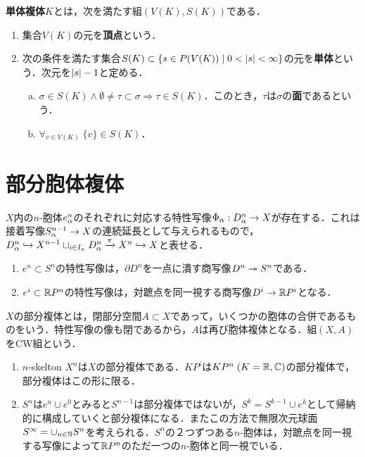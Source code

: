 \documentclass[uplatex,dvipdfmx]{jsreport}
\begin{document}
\begin{definition}
    \textbf{単体複体}$K$とは，次を満たす組$(V(K),S(K))$である．
    \begin{enumerate}
        \item 集合$V(K)$の元を\textbf{頂点}という．
        \item 次の条件を満たす集合$S(K)\subset\left\{s\in P(V(K))\mid 0<\lvert s\rvert<\infty\right\}$の元を\textbf{単体}という．次元を$\lvert s\rvert-1$と定める．
        \begin{enumerate}[(a)]
            \item $\sigma\in S(K)\land\emptyset\ne\tau\subset\sigma\Rightarrow\tau\in S(K)$．このとき，$\tau$は$\sigma$の\textbf{面}であるという．
            \item $\forall_{v\in V(K)}\;\{v\}\in S(K)$．
        \end{enumerate}
    \end{enumerate}
\end{definition}

\section{部分胞体複体}

\begin{definition}
    $X$内の$n$-胞体$e^n_\alpha$のそれぞれに対応する特性写像$\Phi_\alpha:D^n_\alpha\to X$が存在する．これは接着写像$S^{n-1}_\alpha\to X$の連続延長として与えられるもので，$D^n_\alpha\hookrightarrow X^{n-1}\sqcup_{i\in I_n}D^n_\alpha\xrightarrow{\pi}X^n\hookrightarrow X$と表せる．
\end{definition}
\begin{example}\mbox{}
    \begin{enumerate}
        \item $e^n\subset S^n$の特性写像は，$\partial D^n$を一点に潰す商写像$D^n\twoheadrightarrow S^n$である．
        \item $e^i\subset\mathbb{R} P^n$の特性写像は，対蹠点を同一視する商写像$D^i\to\mathbb{R} P^i$となる．
    \end{enumerate}
\end{example}

\begin{definition}
    $X$の部分複体とは，閉部分空間$A\subset X$であって，いくつかの胞体の合併であるものをいう．特性写像の像も閉であるから，$A$は再び胞体複体となる．組$(X,A)$をCW組という．
\end{definition}
\begin{example}\mbox{}
    \begin{enumerate}
        \item $n$-skelton $X^n$は$X$の部分複体である．$KP^i$は$KP^n\;(K=\mathbb{R},\mathbb{C})$の部分複体で，部分複体はこの形に限る．
        \item $S^n$は$e^n\cup e^0$とみると$S^{n-1}$は部分複体ではないが，$S^k=S^{k-1}\cup e^k$として帰納的に構成していくと部分複体になる．またこの方法で無限次元球面$S^\infty=\cup_{n\in\mathbb{N}}S^n$を考えられる．$S^n$の２つずつある$n$-胞体は，対蹠点を同一視する写像によって$\mathbb{R} P^n$のただ一つの$n$-胞体と同一視でいる．
    \end{enumerate}
\end{example}
\end{document}
